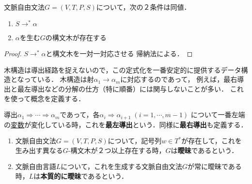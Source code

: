 \documentclass[uplatex, dvipdfmx]{jsreport}
\begin{document}
\begin{theorem}[導出関係の木構造による定式化]
    文脈自由文法$G=(V,T,P,S)$について，次の２条件は同値．
    \begin{enumerate}
        \item $S\rightarrow^*\alpha$
        \item $\alpha$を生む$G$の構文木が存在する
    \end{enumerate}
\end{theorem}
\begin{proof}
    $S\rightarrow^*\alpha$と構文木を一対一対応させる
    帰納法による．
\end{proof}
\begin{remarks}
    木構造は導出経路を捉えないので，この定式化を一番安定的に提供するデータ構造となっている．
    木構造は射$\alpha_1\to\alpha_m$に対応するのであって，
    例えば，最右導出と最左導出などの分解の仕方（特に順番）には関与しないことが多い．
    これを使って概念を定義する．
\end{remarks}

\begin{definition}
    導出$\alpha_1\Rightarrow\cdots\Rightarrow\alpha_m$であって，各$\alpha_i\Rightarrow\alpha_{i+1}\;(i=1,\cdots,m-1)$
    について一番左端の\underline{変数}が変化している時，これを\textbf{最左導出}という．同様に\textbf{最右導出}も定義する．
\end{definition}

\begin{definition}\mbox{}
    \begin{enumerate}
        \item 文脈自由文法$G=(V,T,P,S)$について，記号列$w\in T^*$が存在して，これを生み出す異なる$G$-構文木が２つ以上存在する時，$G$は\textbf{曖昧}であるという．
        \item 文脈自由言語$L$について，これを生成する文脈自由文法$G$が常に曖昧である時，$L$は\textbf{本質的に曖昧}であるという．
    \end{enumerate}
\end{definition}
\end{document}
